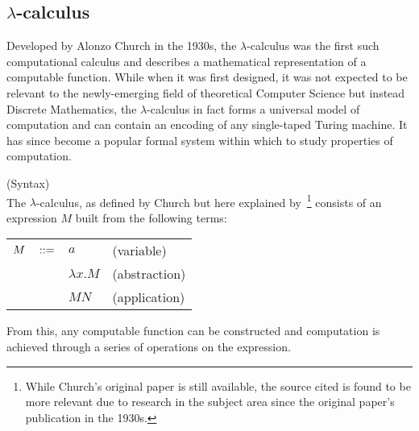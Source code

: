\subsection{\texorpdfstring{$\lambda$-}{Lambda }calculus}\label{ssec:lambda-calculus}

    Developed by Alonzo Church in the 1930s, the $\lambda$-calculus was the first such computational calculus and describes a mathematical representation of a computable function.
    While when it was first designed, it was not expected to be relevant to the newly-emerging field of theoretical Computer Science but instead Discrete Mathematics, the $\lambda$-calculus in fact forms a universal model of computation and can contain an encoding of any single-taped Turing machine.
    It has since become a popular formal system within which to study properties of computation.
    

    \begin{definition}{(Syntax)\\}
        \label{lambda-calculus-syntax}
        The $\lambda$-calculus, as defined by Church but here explained by~\cite{lambda-calculus}\footnote{While Church's original paper is still available, the source cited is found to be more relevant due to research in the subject area since the original paper's publication in the 1930s.} consists of an expression $M$ built from the following terms:
        \begin{center}
            \begin{tabular}{ l l l }
                $M  \quad ::=$       & $a$               & (variable) \\
                                        & $\lambda x . M$   & (abstraction) \\
                                        & $M N$             & (application)
            \end{tabular}
        \end{center}
    \end{definition}
    From this, any computable function can be constructed and computation is achieved through a series of operations on the expression.


